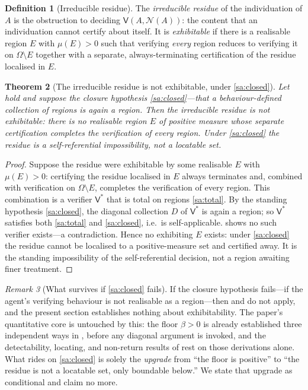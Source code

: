 \documentclass[11pt,a4paper]{article}
\theoremstyle{thmstyle}
\newtheorem{theorem}{Theorem}[section]
\theoremstyle{definition}
\newtheorem{definition}[theorem]{Definition}
\theoremstyle{remark}
\newtheorem{remark}[theorem]{Remark}
\newcommand{\Space}{\Omega}
\newcommand{\thick}{\beta}
\newcommand{\Neg}{\mathcal{N}}
\newcommand{\Ver}{\mathsf{V}}
\begin{document}
\begin{definition}[Irreducible residue]
\label{def:irreducible}
The \emph{irreducible residue} of the individuation of $A$ is the obstruction to
deciding $\Ver(A,\Neg(A))$: the content that an individuation cannot certify
about itself. It is \emph{exhibitable} if there is a realisable region $E$ with
$\mu(E)>0$ such that verifying \emph{every} region reduces to verifying it on
$\Space\setminus E$ together with a separate, always-terminating certification of
the residue localised in $E$.
\end{definition}

\begin{theorem}[The irreducible residue is not exhibitable, under \ref{sa:closed}]
\label{thm:residue-not-measure}
Let  hold and suppose the closure hypothesis \ref{sa:closed}---that
a behaviour-defined collection of regions is again a region. Then the irreducible
residue is not exhibitable: there is no realisable region $E$ of positive measure
whose separate certification completes the verification of every region. Under
\ref{sa:closed} the residue is a self-referential impossibility, not a locatable
set.
\end{theorem}

\begin{proof}
Suppose the residue were exhibitable by some realisable $E$ with $\mu(E)>0$:
certifying the residue localised in $E$ always terminates and, combined with
verification on $\Space\setminus E$, completes the verification of every region.
This combination is a verifier $\Ver^\ast$ that is total on regions
\ref{sa:total}. By the standing hypothesis \ref{sa:closed}, the diagonal
collection $D$ of $\Ver^\ast$ is again a region; so $\Ver^\ast$ satisfies both
\ref{sa:total} and \ref{sa:closed}, i.e.\ is self-applicable. 
shows no such verifier exists---a contradiction. Hence no exhibiting $E$ exists:
under \ref{sa:closed} the residue cannot be localised to a positive-measure set
and certified away. It is the standing impossibility of the self-referential
decision, not a region awaiting finer treatment.
\end{proof}

\begin{remark}[What survives if \ref{sa:closed} fails]
\label{rem:if-sa-fails}
If the closure hypothesis fails---if the agent's verifying behaviour is not
realisable as a region---then  and 
do not apply, and the present section establishes nothing about exhibitability. The
paper's quantitative core is untouched by this: the floor $\thick>0$ is already
established three independent ways in , before any
diagonal argument is invoked, and the detectability, locating, and non-return
results of  rest on those derivations
alone. What rides on \ref{sa:closed} is solely the \emph{upgrade} from ``the floor
is positive'' to ``the residue is not a locatable set, only boundable below.'' We
state that upgrade as conditional and claim no more.
\end{remark}
\end{document}
